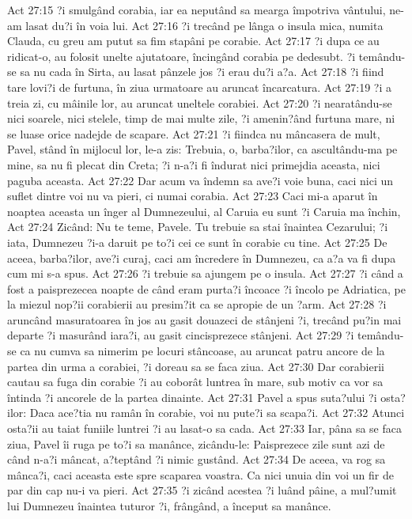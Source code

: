 Act 27:15  ?i smulgând corabia, iar ea neputând sa mearga împotriva vântului, ne-am lasat du?i în voia lui.
Act 27:16  ?i trecând pe lânga o insula mica, numita Clauda, cu greu am putut sa fim stapâni pe corabie.
Act 27:17  ?i dupa ce au ridicat-o, au folosit unelte ajutatoare, încingând corabia pe dedesubt. ?i temându-se sa nu cada în Sirta, au lasat pânzele jos ?i erau du?i a?a.
Act 27:18  ?i fiind tare lovi?i de furtuna, în ziua urmatoare au aruncat încarcatura.
Act 27:19  ?i a treia zi, cu mâinile lor, au aruncat uneltele corabiei.
Act 27:20  ?i nearatându-se nici soarele, nici stelele, timp de mai multe zile, ?i amenin?ând furtuna mare, ni se luase orice nadejde de scapare.
Act 27:21  ?i fiindca nu mâncasera de mult, Pavel, stând în mijlocul lor, le-a zis: Trebuia, o, barba?ilor, ca ascultându-ma pe mine, sa nu fi plecat din Creta; ?i n-a?i fi îndurat nici primejdia aceasta, nici paguba aceasta.
Act 27:22  Dar acum va îndemn sa ave?i voie buna, caci nici un suflet dintre voi nu va pieri, ci numai corabia.
Act 27:23  Caci mi-a aparut în noaptea aceasta un înger al Dumnezeului, al Caruia eu sunt ?i Caruia ma închin,
Act 27:24  Zicând: Nu te teme, Pavele. Tu trebuie sa stai înaintea Cezarului; ?i iata, Dumnezeu ?i-a daruit pe to?i cei ce sunt în corabie cu tine.
Act 27:25  De aceea, barba?ilor, ave?i curaj, caci am încredere în Dumnezeu, ca a?a va fi dupa cum mi s-a spus.
Act 27:26  ?i trebuie sa ajungem pe o insula.
Act 27:27  ?i când a fost a paisprezecea noapte de când eram purta?i încoace ?i încolo pe Adriatica, pe la miezul nop?ii corabierii au presim?it ca se apropie de un ?arm.
Act 27:28  ?i aruncând masuratoarea în jos au gasit douazeci de stânjeni ?i, trecând pu?in mai departe ?i masurând iara?i, au gasit cincisprezece stânjeni.
Act 27:29  ?i temându-se ca nu cumva sa nimerim pe locuri stâncoase, au aruncat patru ancore de la partea din urma a corabiei, ?i doreau sa se faca ziua.
Act 27:30  Dar corabierii cautau sa fuga din corabie ?i au coborât luntrea în mare, sub motiv ca vor sa întinda ?i ancorele de la partea dinainte.
Act 27:31  Pavel a spus suta?ului ?i osta?ilor: Daca ace?tia nu ramân în corabie, voi nu pute?i sa scapa?i.
Act 27:32  Atunci osta?ii au taiat funiile luntrei ?i au lasat-o sa cada.
Act 27:33  Iar, pâna sa se faca ziua, Pavel îi ruga pe to?i sa manânce, zicându-le: Paisprezece zile sunt azi de când n-a?i mâncat, a?teptând ?i nimic gustând.
Act 27:34  De aceea, va rog sa mânca?i, caci aceasta este spre scaparea voastra. Ca nici unuia din voi un fir de par din cap nu-i va pieri.
Act 27:35  ?i zicând acestea ?i luând pâine, a mul?umit lui Dumnezeu înaintea tuturor ?i, frângând, a început sa manânce.
